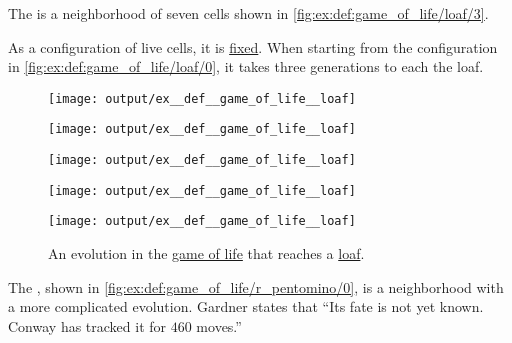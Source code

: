 \begin{example}
\begin{thmenum}
     The  is a neighborhood of seven cells shown in \cref{fig:ex:def:game_of_life/loaf/3}.

    As a configuration of live cells, it is \hyperref[def:dynamical_system_fixed_point]{fixed}. When starting from the configuration in \cref{fig:ex:def:game_of_life/loaf/0}, it takes three generations to each the loaf.

    \begin{figure}[!ht]
      \begin{subcaptionblock}{0.15\textwidth}
        \centering
        \texttt{[image: output/ex\_\_def\_\_game\_of\_life\_\_loaf]}
        \caption{\( t = 0 \)}\label{fig:ex:def:game_of_life/loaf/0}
      \end{subcaptionblock}
      \hfill
      \begin{subcaptionblock}{0.15\textwidth}
        \centering
        \texttt{[image: output/ex\_\_def\_\_game\_of\_life\_\_loaf]}
        \caption{\( t = 1 \)}\label{fig:ex:def:game_of_life/loaf/1}
      \end{subcaptionblock}
      \hfill
      \begin{subcaptionblock}{0.15\textwidth}
        \centering
        \texttt{[image: output/ex\_\_def\_\_game\_of\_life\_\_loaf]}
        \caption{\( t = 2 \)}\label{fig:ex:def:game_of_life/loaf/2}
      \end{subcaptionblock}
      \hfill
      \begin{subcaptionblock}{0.15\textwidth}
        \centering
        \texttt{[image: output/ex\_\_def\_\_game\_of\_life\_\_loaf]}
        \caption{\( t = 3 \)}\label{fig:ex:def:game_of_life/loaf/3}
      \end{subcaptionblock}
      \hfill
      \begin{subcaptionblock}{0.15\textwidth}
        \centering
        \texttt{[image: output/ex\_\_def\_\_game\_of\_life\_\_loaf]}
        \caption{\( t = 4 \)}\label{fig:ex:def:game_of_life/loaf/4}
      \end{subcaptionblock}
      \caption{An evolution in the \hyperref[def:game_of_life]{game of life} that reaches a \hyperref[ex:def:game_of_life/loaf]{loaf}.}\label{fig:ex:def:game_of_life/loaf}
    \end{figure}

     The , shown in \cref{fig:ex:def:game_of_life/r_pentomino/0}, is a neighborhood with a more complicated evolution. Gardner states that \enquote{Its fate is not yet known. Conway has tracked it for \( 460 \) moves.}


\end{thmenum}
\end{example}

